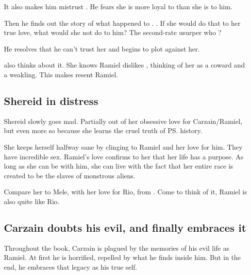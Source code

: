 It also makes him mistrust \Shiaraid. 
He fears she is more loyal to \Aryal{} than she is to him. 

Then he finds out the story of what happened to \Aryal. 
\Shiaraid{} . 
If she would do that to her true love, what would she not do to him? 
The second-rate usurper who ? 

He resolves that he can't trust her and begins to plot against her. 

\Shiaraid{} also thinks about it. 
She knows Ramiel dislikes \Aryal, thinking of her as a coward and a weakling. 
This makes \Shiaraid{} resent Ramiel. 








\subsection{Shereid in distress}
Shereid slowly goes mad. Partially out of her obsessive love for Carzain/Ramiel, but even more so because she learns the cruel truth of \ps{\humanity} history. 

She keeps herself halfway sane by clinging to Ramiel and her love for him. 
They have incredible sex. Ramiel's love confirms to her that her life has a purpose. As long as she can be with him, she can live with the fact that her entire race is created to be the slaves of monstrous aliens. 

Compare her to Mele, with her love for Rio, from \emph{\JuukenSentaiGekiranger}. Come to think of it, Ramiel is also quite like Rio. 









\subsection{Carzain doubts his evil, and finally embraces it}
Throughout the book, Carzain is plagued by the memories of his evil life as Ramiel. At first he is horrified, repelled by what he finds inside him. But in the end, he embraces that legacy as his true self.

